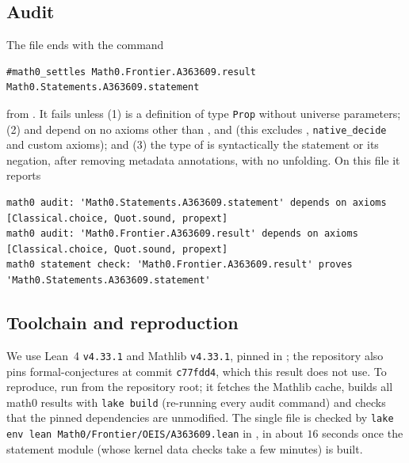 \documentclass[11pt]{amsart}
\theoremstyle{plain}
\theoremstyle{definition}
\begin{document}
\subsection*{Audit}
The file ends with the command
\begin{lstlisting}
#math0_settles Math0.Frontier.A363609.result Math0.Statements.A363609.statement
\end{lstlisting}
from . It fails unless (1)  is a definition of type \texttt{Prop} without universe parameters; (2)  and  depend on no axioms other than ,  and  (this excludes , \texttt{native\_decide} and custom axioms); and (3) the type of  is syntactically the statement or its negation, after removing metadata annotations, with no unfolding. On this file it reports
\begin{lstlisting}[basicstyle=\ttfamily\scriptsize]
math0 audit: 'Math0.Statements.A363609.statement' depends on axioms [Classical.choice, Quot.sound, propext]
math0 audit: 'Math0.Frontier.A363609.result' depends on axioms [Classical.choice, Quot.sound, propext]
math0 statement check: 'Math0.Frontier.A363609.result' proves 'Math0.Statements.A363609.statement'
\end{lstlisting}

\subsection*{Toolchain and reproduction}
We use Lean~4 \cite{Lean4} \texttt{v4.33.1} and Mathlib \cite{Mathlib} \texttt{v4.33.1}, pinned in ; the repository also pins formal-conjectures \cite{FC} at commit \texttt{c77fdd4}, which this result does not use. To reproduce, run  from the repository root; it fetches the Mathlib cache, builds all math0 results with \texttt{lake build} (re-running every audit command) and checks that the pinned dependencies are unmodified. The single file is checked by \texttt{lake env lean Math0/Frontier/OEIS/A363609.lean} in , in about $16$ seconds once the statement module (whose kernel data checks take a few minutes) is built.
\end{document}
